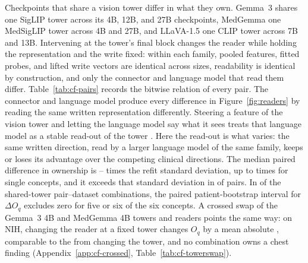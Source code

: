 \documentclass{article}
\begin{document}
Checkpoints that share a vision tower differ in what they own. Gemma~3 shares one SigLIP tower across its 4B, 12B, and 27B checkpoints, MedGemma one MedSigLIP tower across 4B and 27B, and LLaVA-1.5 one CLIP tower across 7B and 13B. Intervening at the tower's final block changes the reader while holding the representation and the write fixed: within each family, pooled features, fitted probes, and lifted write vectors are identical across sizes, readability is identical by construction, and only the connector and language model that read them differ. Table~\ref{tab:cf-pairs} records the bitwise relation of every pair. The connector and language model produce every difference in Figure~\ref{fig:readers} by reading the same written representation differently. Steering a feature of the vision tower and letting the language model say what it sees treats that language model as a stable read-out of the tower \citep{ferrando2026explain}. Here the read-out is what varies: the same written direction, read by a larger language model of the same family, keeps or loses its advantage over the competing clinical directions. The median paired difference in ownership is \cfPairsRatioMin{}--\cfPairsRatioMax{} times the refit standard deviation, up to \cfPairsRatioSingleMax{} times for single concepts, and it exceeds that standard deviation in \cfPairsRatioAboveOne{} of \cfPairsRatioN{} pairs. In \cfPairsFiveOrSix{} of the \cfPairsN{} shared-tower pair--dataset combinations, the paired patient-bootstrap interval for $\Delta O_q$ excludes zero for five or six of the six concepts. A crossed swap of the Gemma~3 4B and MedGemma 4B towers and readers points the same way: on NIH, changing the reader at a fixed tower changes $O_q$ by a mean absolute \cfSwapReaderNihOMin{}, comparable to the \cfSwapTowerNihOMin{} from changing the tower, and no combination owns a chest finding (Appendix~\ref{app:cf-crossed}, Table~\ref{tab:cf-towerswap}).
\end{document}
